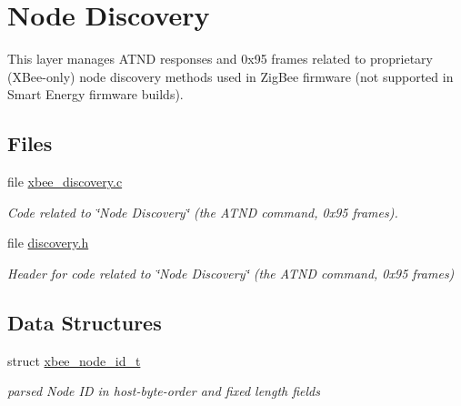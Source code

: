 \hypertarget{group__xbee__discovery}{}\section{Node Discovery}
\label{group__xbee__discovery}


This layer manages A\+T\+ND responses and 0x95 frames related to proprietary (X\+Bee-\/only) node discovery methods used in Zig\+Bee firmware (not supported in Smart Energy firmware builds).  


\subsection*{Files}
\begin{DoxyCompactItemize}
\item 
file \hyperlink{xbee__discovery_8c}{xbee\+\_\+discovery.\+c}
\begin{DoxyCompactList}\small\item\em Code related to \char`\"{}\+Node Discovery\char`\"{} (the A\+T\+ND command, 0x95 frames). \end{DoxyCompactList}\item 
file \hyperlink{discovery_8h}{discovery.\+h}
\begin{DoxyCompactList}\small\item\em Header for code related to \char`\"{}\+Node Discovery\char`\"{} (the A\+T\+ND command, 0x95 frames) \end{DoxyCompactList}\end{DoxyCompactItemize}
\subsection*{Data Structures}
\begin{DoxyCompactItemize}
\item 
struct \hyperlink{structxbee__node__id__t}{xbee\+\_\+node\+\_\+id\+\_\+t}
\begin{DoxyCompactList}\small\item\em parsed Node ID in host-\/byte-\/order and fixed length fields \end{DoxyCompactList}\end{DoxyCompactItemize}
